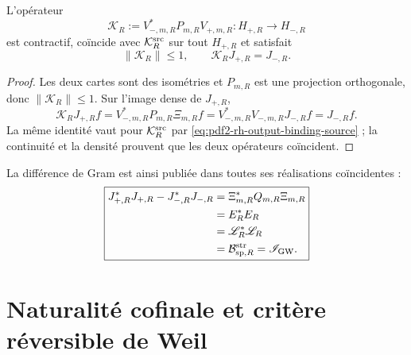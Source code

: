 \begin{proposition}
\label{prop:pdf2-rh-conector}
L'opérateur
\begin{equation}\label{eq:pdf2-rh-k-r}
 \mathcal K_R
 :=V_{-,m,R}^*P_{m,R}V_{+,m,R}:
 H_{+,R}\longrightarrow H_{-,R}
\end{equation}
est contractif, coïncide avec \(\mathcal K_R^{\rm src}\) sur tout
\(H_{+,R}\) et satisfait
\begin{equation}\label{eq:pdf2-rh-k-binding}
 \|\mathcal K_R\|\leq1,
 \qquad
 \mathcal K_RJ_{+,R}=J_{-,R}.
\end{equation}
\end{proposition}

\begin{proof}
Les deux cartes sont des isométries et \(P_{m,R}\) est une projection orthogonale,
donc \(\|\mathcal K_R\|\leq1\). Sur l'image dense de \(J_{+,R}\),
\[
 \mathcal K_RJ_{+,R}f
 =V_{-,m,R}^*P_{m,R}\Xi_{m,R}f
 =V_{-,m,R}^*V_{-,m,R}J_{-,R}f
 =J_{-,R}f.
\]
La même identité vaut pour \(\mathcal K_R^{\rm src}\) par
\eqref{eq:pdf2-rh-output-binding-source} ; la continuité et la densité
prouvent que les deux opérateurs coïncident.
\end{proof}

La différence de Gram est ainsi publiée dans toutes ses réalisations
coïncidentes :
\begin{equation}\label{eq:pdf2-rh-tres-publicaciones}
\boxed{
\begin{aligned}
 J_{+,R}^*J_{+,R}-J_{-,R}^*J_{-,R}
 &=\Xi_{m,R}^*Q_{m,R}\Xi_{m,R}\\
 &=E_R^*E_R\\
 &=\mathscr L_R^*\mathscr L_R\\
 &=\mathcal B_{{\rm sp},R}^{\rm str}=\mathscr I_{\rm GW}.
\end{aligned}}
\end{equation}

\section{Naturalité cofinale et critère réversible de Weil}

